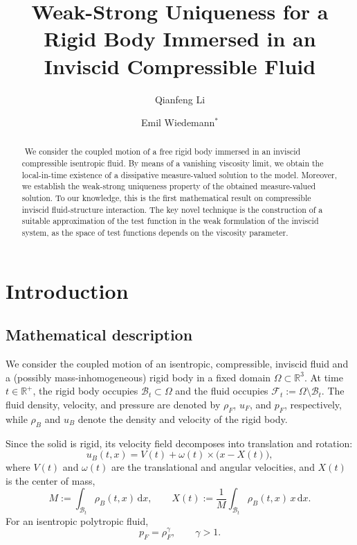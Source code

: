 \documentclass[11pt,twoside,reqno]{amsart}
\title[Weak-Strong Uniqueness for a RigiD Body in an Inviscid Compressible Fluid]{Weak-Strong Uniqueness for a Rigid Body Immersed in an Inviscid Compressible Fluid}
\author{Qianfeng Li}
\author{Emil Wiedemann$^{*}$}
\numberwithin{equation}{section}
\numberwithin{figure}{section}
\renewcommand{\thefootnote}{\ensuremath{\fnsymbol{footnote}}}
\begin{document}
	\begin{abstract}
		\,\,We consider the coupled motion of a free rigid body immersed in an inviscid compressible isentropic fluid. By means of a vanishing viscosity limit, we obtain the local-in-time existence of a dissipative measure-valued solution to the model. Moreover, we establish the weak-strong uniqueness property of the obtained measure-valued solution. To our knowledge, this is the first mathematical result on compressible inviscid fluid-structure interaction. The key novel technique is the construction of a suitable approximation of the test function in the weak formulation of the inviscid system, as the space of test functions depends on the viscosity parameter.  
	\end{abstract}
	
	\maketitle

\begingroup
\renewcommand\thefootnote{\fnsymbol{footnote}}
\endgroup

    
	\section{Introduction}
\subsection{Mathematical description}

We consider the coupled motion of an isentropic, compressible, inviscid fluid and a (possibly mass-inhomogeneous) rigid body in a fixed domain $\Omega \subset \mathbb{R}^3$. At time $t \in \mathbb{R}^+$, the rigid body occupies $\mathcal{B}_t \subset \Omega$ and the fluid occupies $\mathcal{F}_t := \Omega \setminus \mathcal{B}_t$.
The fluid density, velocity, and pressure are denoted by $\rho_F$, $u_F$, and $p_F$, respectively, while $\rho_B$ and $u_B$ denote the density and velocity of the rigid body.

Since the solid is rigid, its velocity field decomposes into translation and rotation:
\begin{equation}\label{eq:rigid-vel}
    u_B(t,x) = V(t) + \omega(t) \times \bigl(x - X(t)\bigr),
\end{equation}
where $V(t)$ and $\omega(t)$ are the translational and angular velocities, and $X(t)$ is the center of mass,
\begin{equation}\label{eq:com}
    M := \int_{\mathcal{B}_t} \rho_B(t,x)\, \mathrm{d}x,
    \qquad
    X(t) := \frac{1}{M}\int_{\mathcal{B}_t} \rho_B(t,x)\, x \,\mathrm{d}x .
\end{equation}
For an isentropic polytropic fluid,
\begin{equation}\label{eq:state}
    p_F = \rho_F^{\gamma}, \qquad \gamma>1.
\end{equation}
\end{document}

